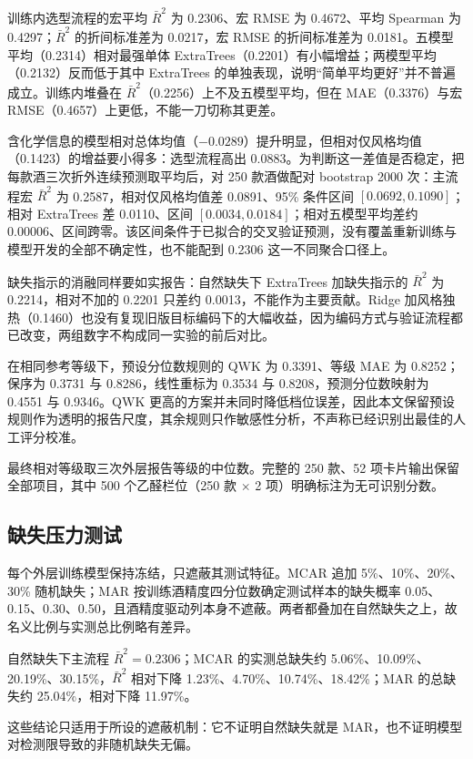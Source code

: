 \documentclass[UTF8,a4paper,zihao=-4]{ctexart}
\numberwithin{figure}{section}
\numberwithin{table}{section}
\numberwithin{equation}{section}
\begin{document}
训练内选型流程的宏平均 $\bar R^2$ 为 0.2306、宏 RMSE 为 0.4672、平均 Spearman 为 0.4297；$\bar R^2$ 的折间标准差为 0.0217，宏 RMSE 的折间标准差为 0.0181。五模型平均（0.2314）相对最强单体 ExtraTrees（0.2201）有小幅增益；两模型平均（0.2132）反而低于其中 ExtraTrees 的单独表现，说明“简单平均更好”并不普遍成立。训练内堆叠在 $\bar R^2$（0.2256）上不及五模型平均，但在 MAE（0.3376）与宏 RMSE（0.4657）上更低，不能一刀切称其更差。

含化学信息的模型相对总体均值（$-0.0289$）提升明显，但相对仅风格均值（0.1423）的增益要小得多：选型流程高出 0.0883。为判断这一差值是否稳定，把每款酒三次折外连续预测取平均后，对 250 款酒做配对 bootstrap 2000 次：主流程宏 $\bar R^2$ 为 0.2587，相对仅风格均值差 0.0891、95\% 条件区间 $[0.0692,0.1090]$；相对 ExtraTrees 差 0.0110、区间 $[0.0034,0.0184]$；相对五模型平均差约 0.00006、区间跨零。该区间条件于已拟合的交叉验证预测，没有覆盖重新训练与模型开发的全部不确定性，也不能配到 0.2306 这一不同聚合口径上。

缺失指示的消融同样要如实报告：自然缺失下 ExtraTrees 加缺失指示的 $\bar R^2$ 为 0.2214，相对不加的 0.2201 只差约 0.0013，不能作为主要贡献。Ridge 加风格独热（0.1460）也没有复现旧版目标编码下的大幅收益，因为编码方式与验证流程都已改变，两组数字不构成同一实验的前后对比。

在相同参考等级下，预设分位数规则的 QWK 为 0.3391、等级 MAE 为 0.8252；保序为 0.3731 与 0.8286，线性重标为 0.3534 与 0.8208，预测分位数映射为 0.4551 与 0.9346。QWK 更高的方案并未同时降低档位误差，因此本文保留预设规则作为透明的报告尺度，其余规则只作敏感性分析，不声称已经识别出最佳的人工评分校准。

最终相对等级取三次外层报告等级的中位数。完整的 250 款、52 项卡片输出保留全部项目，其中 500 个乙醛栏位（250 款 $\times$ 2 项）明确标注为无可识别分数。

\subsection{缺失压力测试}

每个外层训练模型保持冻结，只遮蔽其测试特征。MCAR 追加 5\%、10\%、20\%、30\% 随机缺失；MAR 按训练酒精度四分位数确定测试样本的缺失概率 0.05、0.15、0.30、0.50，且酒精度驱动列本身不遮蔽。两者都叠加在自然缺失之上，故名义比例与实测总比例略有差异。

自然缺失下主流程 $\bar R^2=0.2306$；MCAR 的实测总缺失约 5.06\%、10.09\%、20.19\%、30.15\%，$\bar R^2$ 相对下降 1.23\%、4.70\%、10.74\%、18.42\%；MAR 的总缺失约 25.04\%，相对下降 11.97\%。

这些结论只适用于所设的遮蔽机制：它不证明自然缺失就是 MAR，也不证明模型对检测限导致的非随机缺失无偏。
\end{document}
